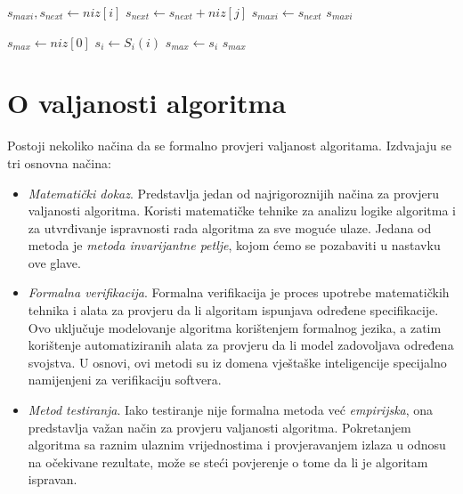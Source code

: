  

 \begin{algorithm}[!ht]
 	\caption{Funkcija $S_i(i)$}\label{S_i}
 	\begin{algorithmic}[1]
 		\State $s_{maxi}, s_{next} \gets niz[i]$
 		\State $s_{next} \gets s_{next} + niz[j]$
 		\State $s_{maxi} \gets s_{next}$
 		\EndIf
 		\EndFor  
 		\State \Return $s_{maxi}$
 		\EndProcedure
 	\end{algorithmic}
 \end{algorithm}



\begin{algorithm}[H]
	\caption{Funkcija $S$}\label{S}
	\begin{algorithmic}[1]
		\State $s_{max}\gets niz[0]$ 
		\State $s_i \gets  S_i(i)$ 
		    \State $s_{max} \gets s_{i}$
		  \EndIf
		\EndFor  
		\State  \Return  $s_{max}$
		\EndProcedure
	\end{algorithmic}
\end{algorithm}

\section{O valjanosti algoritma}

Postoji nekoliko načina da se formalno provjeri valjanost algoritama. Izdvajaju se tri osnovna načina:

\begin{itemize}
	\item \textit{Matematički dokaz}. Predstavlja jedan od najrigoroznijih načina za provjeru valjanosti algoritma.  %
	Koristi matematičke tehnike za analizu logike algoritma i za utvrđivanje ispravnosti rada algoritma za sve moguće ulaze. Jedana od metoda je \textit{metoda invarijantne petlje}, kojom ćemo se pozabaviti u nastavku ove glave. 
	
    \item \textit{Formalna verifikacija}. Formalna verifikacija je proces upotrebe mate\-matičkih tehnika i alata za provjeru da li algoritam ispunjava određene specifikacije. Ovo uključuje modelovanje algoritma korištenjem forma\-lnog jezika, a zatim korištenje automatiziranih alata za provjeru da li model zadovoljava određena svojstva. U osnovi, ovi metodi su iz domena vještaške inteligencije specijalno namijenjeni za verifikaciju softvera.
    \item \textit{Metod testiranja}.  Iako testiranje nije formalna metoda već \textit{empirijska}, ona predstavlja važan način za provjeru valjanosti algoritma. Pokreta\-njem algoritma sa raznim ulaznim vrijednostima i provjeravanjem izlaza u odnosu na očekivane rezultate, može se steći povjerenje o tome da li je algoritam ispravan.

\end{itemize}


